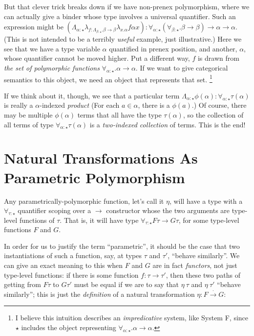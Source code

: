 \documentclass[letterpaper]{article}
\begin{document}
But that clever trick breaks down if we have non-prenex polymorphism, where
we can actually give a binder whose type involves a universal quantifier.
Such an expression might be $(\Lambda_{\alpha : \star} \lambda_{f :
\Lambda_{\beta : \star} . \beta \to \beta} \lambda_{x . \alpha} f \alpha x)
: \forall_{\alpha : \star} (\forall_{\beta : \star} . \beta \to \beta) \to
\alpha \to \alpha$.  (This is not intended to be a terribly {\em useful}
example, just illustrative.)  Here we see that we have a type variable
$\alpha$ quantified in prenex position, and another, $\alpha$, whose
quantifier cannot be moved higher.  Put a different way, $f$ is drawn from
{\em the set of polymorphic functions} $\forall_{\alpha : \star} . \alpha
\to \alpha$.  If we want to give categorical semantics to this object, we
need an object that represents that set.%
%
\footnote{I believe this intuition describes an {\em impredicative} system,
like System F, since $\star$ includes the object representing
$\forall_{\alpha : \star} . \alpha \to \alpha$.}

If we think about it, though, we see that a particular term $\Lambda_{\alpha
: \star} \phi(\alpha) : \forall_{\alpha : \star} \tau(\alpha)$ is really a
$\alpha$-indexed {\em product} (For each $a \in \alpha$, there is a
$\phi(a)$.)  Of course, there may be multiple $\phi(\alpha)$ terms that all
have the type $\tau(\alpha)$, so the collection of all terms of type
$\forall_{\alpha : \star} \tau(\alpha)$ is a {\em two-indexed collection} of
terms.  This is the end!

\section{Natural Transformations As Parametric Polymorphism}

Any parametrically-polymorphic function, let's call it $\eta$, will have a
type with a $\forall_{\tau : \star}$ quantifier scoping over a $\to$
constructor whose the two arguments are type-level functions of $\tau$.
That is, it will have type $\forall_{\tau : \star} F \tau \to G \tau$, for
some type-level functions $F$ and $G$.


In order for us to justify the term ``parametric'', it should be the case
that two instantiations of such a function, say, at types $\tau$ and
$\tau'$, ``behave similarly''.  We can give an exact meaning to this when
$F$ and $G$ are in fact {\em functors}, not just type-level functions: if
there is some function $f : \tau \to \tau'$, then these two paths of getting
from $F \tau$ to $G \tau'$ must be equal if we are to say that $\eta~\tau$
and $\eta~\tau'$ ``behave similarly''; this is just the {\em definition} of
a natural transformation $\eta : F \stackrel{\cdot}{\to} G$:
\end{document}
